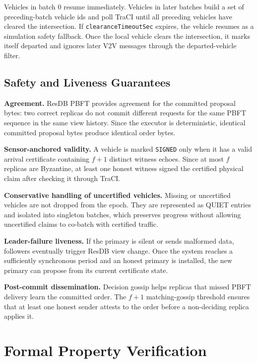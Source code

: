 \documentclass[fleqn,10pt]{olplainarticle}
\begin{document}
Vehicles in batch $0$ resume immediately. Vehicles in later batches build a set of preceding-batch vehicle ids and poll TraCI until all preceding vehicles have cleared the intersection. If \texttt{clearanceTimeoutSec} expires, the vehicle resumes as a simulation safety fallback. Once the local vehicle clears the intersection, it marks itself departed and ignores later V2V messages through the departed-vehicle filter.

\subsection{Safety and Liveness Guarantees}
\label{subsec:bft-safety-liveness}

\textbf{Agreement.} ResDB PBFT provides agreement for the committed proposal bytes: two correct replicas do not commit different requests for the same PBFT sequence in the same view history. Since the executor is deterministic, identical committed proposal bytes produce identical order bytes.

\textbf{Sensor-anchored validity.} A vehicle is marked \texttt{SIGNED} only when it has a valid arrival certificate containing $f+1$ distinct witness echoes. Since at most $f$ replicas are Byzantine, at least one honest witness signed the certified physical claim after checking it through TraCI.

\textbf{Conservative handling of uncertified vehicles.} Missing or uncertified vehicles are not dropped from the epoch. They are represented as QUIET entries and isolated into singleton batches, which preserves progress without allowing uncertified claims to co-batch with certified traffic.

\textbf{Leader-failure liveness.} If the primary is silent or sends malformed data, followers eventually trigger ResDB view change. Once the system reaches a sufficiently synchronous period and an honest primary is installed, the new primary can propose from its current certificate state.

\textbf{Post-commit dissemination.} Decision gossip helps replicas that missed PBFT delivery learn the committed order. The $f+1$ matching-gossip threshold ensures that at least one honest sender attests to the order before a non-deciding replica applies it.

\section{Formal Property Verification}
\label{sec:formal-property-verification}
\end{document}
